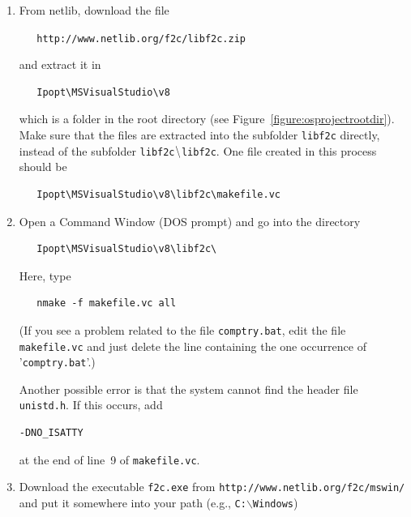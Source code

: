 \documentclass[11pt]{article}
\newcounter{Fig}
\renewcommand{\_}{{\char"5F}}
\renewcommand{\{}{{\char"7B}}
\renewcommand{\}}{{\char"7D}}
\renewcommand{\^}{{\char"0D}}
\renewcommand{\'}{{\char"0D}}
\newcommand{\UrlFToCBin}{http://www.netlib.org/f2c/mswin/}
\newcommand{\UrlFToCZip}{http://www.netlib.org/f2c/libf2c.zip}
\begin{document}
\begin{enumerate}


\item{} From netlib, download the file


{\tt\ \ \ \UrlFToCZip}

   and extract it in

\begin{verbatim}
   Ipopt\MSVisualStudio\v8
\end{verbatim}


 which is a folder in the root directory (see Figure~\ref{figure:osprojectrootdir}). Make sure that the files
are extracted into the subfolder {\tt libf2c} directly, instead of the subfolder {\tt libf2c$\tt\backslash$libf2c}.
One file created in this process should be

\begin{verbatim}
   Ipopt\MSVisualStudio\v8\libf2c\makefile.vc
\end{verbatim}


\item{} Open a Command Window (DOS prompt) and go into the directory

\begin{verbatim}
   Ipopt\MSVisualStudio\v8\libf2c\
\end{verbatim}

   Here, type

\begin{verbatim}
   nmake -f makefile.vc all
\end{verbatim}

   (If you see a problem related to the file {\tt comptry.bat}, edit the
   file {\tt makefile.vc} and just delete the line containing the one occurrence of
   '{\tt comptry.bat}'.)

Another possible error is that the system cannot find the header file {\tt unistd.h}.
If this occurs, add

\begin{verbatim}
-DNO_ISATTY
\end{verbatim}

at the end of line~9 of {\tt makefile.vc}.

\item{} Download the executable {\tt f2c.exe} from {\tt\UrlFToCBin}
and put it somewhere into your path
   (e.g., {\tt C:$\backslash$Windows})


\end{enumerate}
\end{document}
